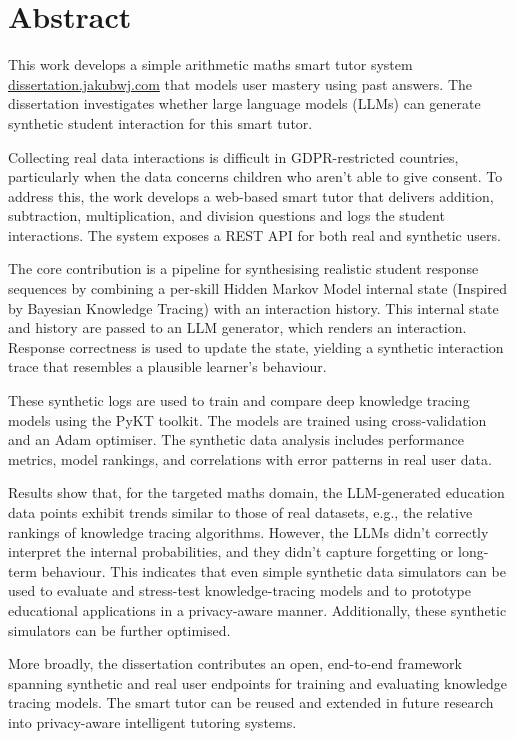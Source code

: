 \chapter*{Abstract}
This work develops a simple arithmetic maths smart tutor system \href{https:\\dissertation.jakubwj.com}{dissertation.jakubwj.com} that models user mastery using past answers. The dissertation investigates whether large language models (LLMs) can generate synthetic student interaction for this smart tutor.

Collecting real data interactions is difficult in GDPR-restricted countries, particularly when the data concerns children who aren't able to give consent. To address this, the work develops a web-based smart tutor that delivers addition, subtraction, multiplication, and division questions and logs the student interactions. The system exposes a REST API for both real and synthetic users.

The core contribution is a pipeline for synthesising realistic student response sequences by combining a per-skill Hidden Markov Model internal state (Inspired by Bayesian Knowledge Tracing) with an interaction history. This internal state and history are passed to an LLM generator, which renders an interaction. Response correctness is used to update the state, yielding a synthetic interaction trace that resembles a plausible learner's behaviour.

These synthetic logs are used to train and compare deep knowledge tracing models using the PyKT toolkit. The models are trained using cross-validation and an Adam optimiser. The synthetic data analysis includes performance metrics, model rankings, and correlations with error patterns in real user data.

Results show that, for the targeted maths domain, the LLM-generated education data points exhibit trends similar to those of real datasets, e.g., the relative rankings of knowledge tracing algorithms. However, the LLMs didn't correctly interpret the internal probabilities, and they didn't capture forgetting or long-term behaviour. This indicates that even simple synthetic data simulators can be used to evaluate and stress-test knowledge-tracing models and to prototype educational applications in a privacy-aware manner. Additionally, these synthetic simulators can be further optimised.

More broadly, the dissertation contributes an open, end-to-end framework spanning synthetic and real user endpoints for training and evaluating knowledge tracing models. The smart tutor can be reused and extended in future research into privacy-aware intelligent tutoring systems.